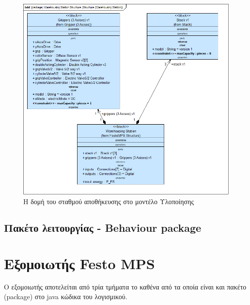 \documentclass[a4paper,12pt,twoside]{report}
\begin{document}
\begin{appendices}
				\begin{figure}[hp]
					\centering
					\includegraphics[scale=0.50]{DesignModel_Structure(WarehousingStation).png}
					\caption{Η δομή του σταθμού αποθήκευσης στο μοντέλο Υλοποίησης}
					\label{φωτ:Η δομή του σταθμού αποθήκευσης στο μοντέλο Υλοποίησης}
				\end{figure}	
				
			\FloatBarrier
			\subsection{Πακέτο λειτουργίας - Behaviour package}
			\clearpage

		\FloatBarrier
		\section{Εξομοιωτής Festo MPS\textregistered{}}
		\clearpage
		
			\paragraph{} {O εξομοιωτής αποτελείται από τρία τμήματα το καθένα από τα οποία είναι και πακέτο (package) στο java κώδικα του λογισμικού.
			}
			

\end{appendices}
\end{document}
